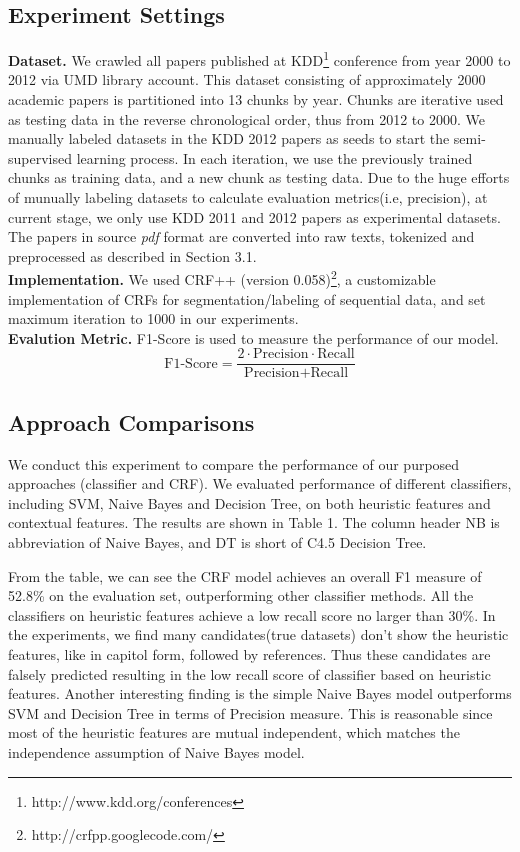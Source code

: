 \documentclass[10pt]{article}
\begin{document}
\subsection{Experiment Settings}
\textbf{Dataset.} We crawled all papers published at KDD\footnote{http://www.kdd.org/conferences} conference from year 2000 to 2012 via UMD library account. This dataset consisting of approximately 2000 academic papers is partitioned into 13 chunks by year. Chunks are iterative used as testing data in the reverse chronological order, thus from 2012 to 2000. We manually labeled datasets in the KDD 2012 papers as seeds to start the semi-supervised learning process. In each iteration, we use the previously trained chunks as training data, and a new chunk as testing data. Due to the huge efforts of munually labeling datasets to calculate evaluation metrics(i.e, precision), at current stage, we only use KDD 2011 and 2012 papers as experimental datasets. The papers in source \emph{pdf} format are converted into raw texts, tokenized and preprocessed as described in Section 3.1. \\
\textbf{Implementation.} We used CRF++ (version 0.058)\footnote{http://crfpp.googlecode.com/}, a customizable implementation of CRFs for segmentation/labeling of sequential data, and set maximum iteration to 1000 in our experiments. \\
\textbf{Evalution Metric.} F1-Score is used to measure the performance of our model. 
\[
	\text{F1-Score} = \frac{2 \cdot \text{Precision} \cdot \text{Recall}}{\text{Precision} + \text{Recall}}
\]

\subsection{Approach Comparisons}
We conduct this experiment to compare the performance of our purposed approaches (classifier and CRF). We evaluated performance of different classifiers, including SVM, Naive Bayes and Decision Tree, on both heuristic features and contextual features. The results are shown in Table 1. The column header NB is abbreviation of Naive Bayes, and DT is short of C4.5 Decision Tree.

From the table, we can see the CRF model achieves an overall F1 measure of 52.8\% on the evaluation set, outperforming other classifier methods. All the classifiers on heuristic features achieve a low recall score no larger than 30\%. In the experiments, we find many candidates(true datasets) don't show the heuristic features, like in capitol form, followed by references. Thus these candidates are falsely predicted resulting in the low recall score of classifier based on heuristic features. Another interesting finding is the simple Naive Bayes model outperforms SVM and Decision Tree in terms of Precision measure. This is reasonable since most of the heuristic features are mutual independent, which matches the independence assumption of Naive Bayes model. 
\end{document}
